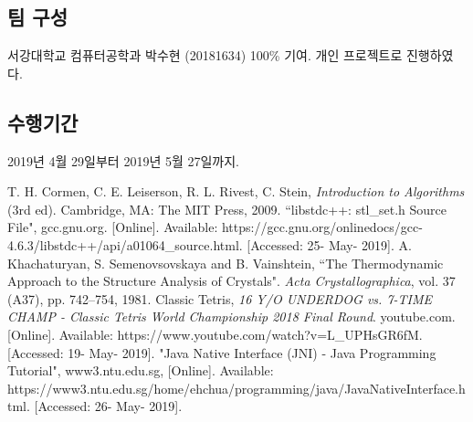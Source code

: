 \subsection{팀 구성}
서강대학교 컴퓨터공학과 박수현 (20181634) 100\% 기여. 개인 프로젝트로 진행하였다.

\subsection{수행기간}
2019년 4월 29일부터 2019년 5월 27일까지.

\begin{thebibliography}{1}
     T. H. Cormen, C. E. Leiserson, R. L. Rivest, C. Stein, \textit{Introduction
    to Algorithms} (3rd ed). Cambridge, MA: The MIT Press, 2009.
     ``libstdc++: stl_set.h Source File", gcc.gnu.org. [Online].
    Available: https://gcc.gnu.org/onlinedocs/gcc-4.6.3/libstdc++/api/a01064_source.html.
    [Accessed: 25- May- 2019].
     A. Khachaturyan, S. Semenovsovskaya and B. Vainshtein,
    ``The Thermodynamic Approach to the Structure Analysis of Crystals". \textit{Acta Crystallographica}, vol. 37 (A37), pp. 742–754, 1981.
     Classic Tetris, \textit{16 Y/O UNDERDOG vs. 7-TIME CHAMP - Classic Tetris World Championship 2018 Final Round}. youtube.com. [Online].
    Available: https://www.youtube.com/watch?v=L_UPHsGR6fM. [Accessed: 19- May- 2019].
     "Java Native Interface (JNI) - Java Programming Tutorial", www3.ntu.edu.sg,
    [Online]. Available: https://www3.ntu.edu.sg/home/ehchua/programming/java/JavaNativeInterface.html. [Accessed: 26- May- 2019].
\end{thebibliography}


